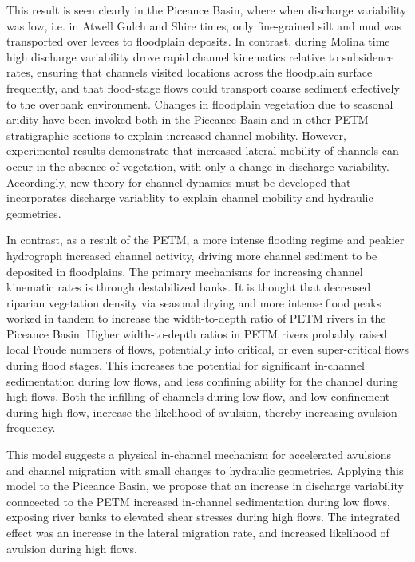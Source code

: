 \documentclass[draft]{compact_proposal}\usepackage[]{graphicx}\usepackage[]{color}
\begin{document}
This result is seen clearly in the Piceance Basin, where when discharge variability was low, i.e. in Atwell Gulch and Shire times, only fine-grained silt and mud was transported over levees to floodplain deposits.
In contrast, during Molina time high discharge variability drove rapid channel kinematics relative to subsidence rates, ensuring that channels visited locations across the floodplain surface frequently, and that flood-stage flows could transport coarse sediment effectively to the overbank environment.
Changes in floodplain vegetation due to seasonal aridity have been invoked both in the Piceance Basin and in other PETM stratigraphic sections to explain increased channel mobility.
However, experimental results demonstrate that increased lateral mobility of channels can occur in the absence of vegetation, with only a change in discharge variability.
Accordingly, new theory for channel dynamics must be developed that incorporates discharge variablity to explain channel mobility and hydraulic geometries. 


In contrast, as a result of the PETM, a more intense flooding regime and peakier hydrograph increased channel activity, driving more channel sediment to be deposited in floodplains.
The primary mechanisms for increasing channel kinematic rates is through destabilized banks.
It is thought that decreased riparian vegetation density via seasonal drying and more intense flood peaks worked in tandem to increase the width-to-depth ratio of PETM rivers in the Piceance Basin.
Higher width-to-depth ratios in PETM rivers probably raised local Froude numbers of flows, potentially into critical, or even super-critical flows during flood stages.
This increases the potential for significant in-channel sedimentation during low flows, and less confining ability for the channel during high flows.
Both the infilling of channels during low flow, and low confinement during high flow, increase the likelihood of avulsion, thereby increasing avulsion frequency.

This model suggests a physical in-channel mechanism for accelerated avulsions and channel migration with small changes to hydraulic geometries. 
Applying this model to the Piceance Basin, we propose that an increase in discharge variability conncected to the PETM increased in-channel sedimentation during low flows, exposing river banks to elevated shear stresses during high flows. 
The integrated effect was an increase in the lateral migration rate, and increased likelihood of avulsion during high flows. 
\end{document}
